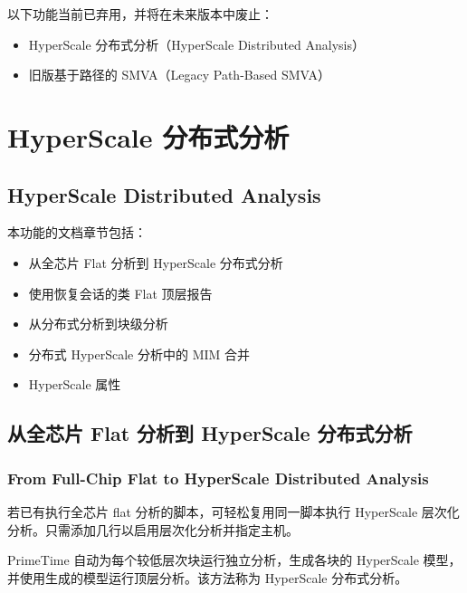\label{chap:deprecated}

以下功能当前已弃用，并将在未来版本中废止：
\begin{itemize}
  \item HyperScale 分布式分析（HyperScale Distributed Analysis）
  \item 旧版基于路径的 SMVA（Legacy Path-Based SMVA）
\end{itemize}

\section{HyperScale 分布式分析}
\subsection*{HyperScale Distributed Analysis}

本功能的文档章节包括：
\begin{itemize}
  \item 从全芯片 Flat 分析到 HyperScale 分布式分析
  \item 使用恢复会话的类 Flat 顶层报告
  \item 从分布式分析到块级分析
  \item 分布式 HyperScale 分析中的 MIM 合并
  \item HyperScale 属性
\end{itemize}

\subsection{从全芯片 Flat 分析到 HyperScale 分布式分析}
\subsubsection*{From Full-Chip Flat to HyperScale Distributed Analysis}

若已有执行全芯片 flat 分析的脚本，可轻松复用同一脚本执行 HyperScale 层次化分析。只需添加几行以启用层次化分析并指定主机。

PrimeTime 自动为每个较低层次块运行独立分析，生成各块的 HyperScale 模型，并使用生成的模型运行顶层分析。该方法称为 HyperScale 分布式分析。

